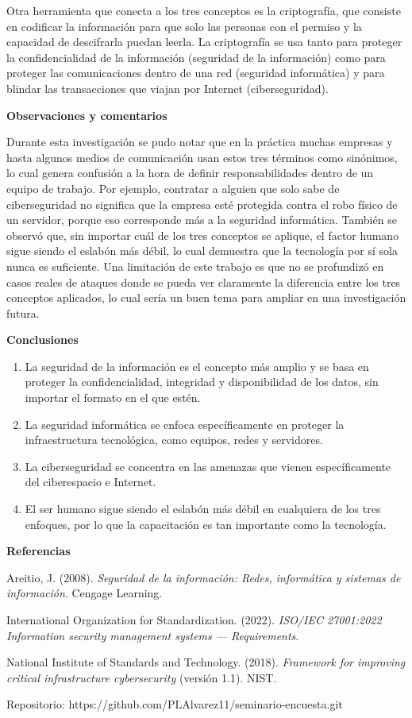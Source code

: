 \documentclass[12pt,letterpaper]{article}
\begin{document}
Otra herramienta que conecta a los tres conceptos es la criptografía, que consiste en codificar la información para que solo las personas con el permiso y la capacidad de descifrarla puedan leerla. La criptografía se usa tanto para proteger la confidencialidad de la información (seguridad de la información) como para proteger las comunicaciones dentro de una red (seguridad informática) y para blindar las transacciones que viajan por Internet (ciberseguridad).

\textbf{Observaciones y comentarios}

Durante esta investigación se pudo notar que en la práctica muchas empresas y hasta algunos medios de comunicación usan estos tres términos como sinónimos, lo cual genera confusión a la hora de definir responsabilidades dentro de un equipo de trabajo. Por ejemplo, contratar a alguien que solo sabe de ciberseguridad no significa que la empresa esté protegida contra el robo físico de un servidor, porque eso corresponde más a la seguridad informática. También se observó que, sin importar cuál de los tres conceptos se aplique, el factor humano sigue siendo el eslabón más débil, lo cual demuestra que la tecnología por sí sola nunca es suficiente. Una limitación de este trabajo es que no se profundizó en casos reales de ataques donde se pueda ver claramente la diferencia entre los tres conceptos aplicados, lo cual sería un buen tema para ampliar en una investigación futura.

\textbf{Conclusiones}

\begin{enumerate}[label=\arabic*.]
\item La seguridad de la información es el concepto más amplio y se basa en proteger la confidencialidad, integridad y disponibilidad de los datos, sin importar el formato en el que estén.
\item La seguridad informática se enfoca específicamente en proteger la infraestructura tecnológica, como equipos, redes y servidores.
\item La ciberseguridad se concentra en las amenazas que vienen específicamente del ciberespacio e Internet.
\item El ser humano sigue siendo el eslabón más débil en cualquiera de los tres enfoques, por lo que la capacitación es tan importante como la tecnología.
\end{enumerate}

\textbf{Referencias}

Areitio, J. (2008). \textit{Seguridad de la información: Redes, informática y sistemas de información}. Cengage Learning.

International Organization for Standardization. (2022). \textit{ISO/IEC 27001:2022 Information security management systems — Requirements}.

National Institute of Standards and Technology. (2018). \textit{Framework for improving critical infrastructure cybersecurity} (versión 1.1). NIST.

\vspace{0.5cm}
\noindent \small Repositorio: https://github.com/PLAlvarez11/seminario-encuesta.git
\end{document}
